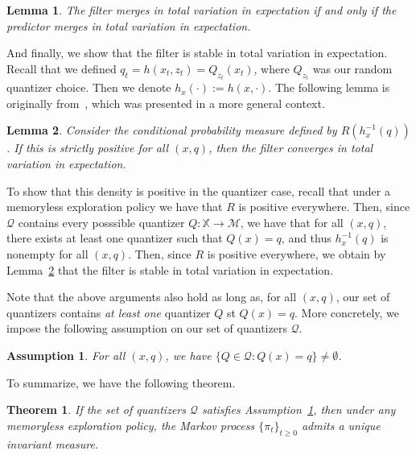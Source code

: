 \documentclass[conference, draftcls, onecolumn]{IEEEtran}
\newtheorem{theorem}{Theorem}
\newtheorem{lemma}{Lemma}
\newtheorem{assumption}{Assumption}
\begin{document}
\begin{lemma}\label{lemma:filter-predictor}\cite[Theorem 2.11]{Curtis}
    The filter merges in total variation in expectation if and only if the predictor merges in total variation in expectation.
\end{lemma}

And finally, we show that the filter is stable in total variation in expectation. Recall that we defined \(q_t = h(x_t,z_t) = Q_{z_t}(x_t)\), where \(Q_{z_t}\) was our random quantizer choice. Then we denote \(h_x(\cdot) := h(x,\cdot)\). The following lemma is originally from~\cite{Handel}, which was presented in a more general context.

\begin{lemma}\label{lemma:nondegenerate}\cite[Corollary 5.5]{Handel}
    Consider the conditional probability measure defined by \( R(h_x^{-1}(q)) \). If this is strictly positive for all \((x,q)\), then the filter converges in total variation in expectation.
\end{lemma}

To show that this density is positive in the quantizer case, recall that under a memoryless exploration policy we have that \(R\) is positive everywhere. Then, since \( \mathcal{Q} \) contains every posssible quantizer \( Q : \mathbb{X} \to \mathcal{M} \), we have that for all \( (x,q) \), there exists at least one quantizer such that \( Q(x) = q \), and thus \( h_x^{-1}(q) \) is nonempty for all \( (x,q) \). Then, since \(R\) is positive everywhere, we obtain by Lemma~\ref{lemma:nondegenerate} that the filter is stable in total variation in expectation.

Note that the above arguments also hold as long as, for all \( (x,q) \), our set of quantizers contains \emph{at least one} quantizer \( Q \) st \( Q(x) = q \). More concretely, we impose the following assumption on our set of quantizers \( \mathcal{Q} \).

\begin{assumption}\label{assumption:one-bin}
    For all \((x,q)\), we have \(\{Q \in \mathcal{Q} : Q(x) = q\} \neq \emptyset\).

\end{assumption}

\noindent To summarize, we have the following theorem.

\begin{theorem}\label{theorem:invariant}
    If the set of quantizers \( \mathcal{Q} \) satisfies Assumption~\ref{assumption:one-bin}, then under any memoryless exploration policy, the Markov process \( \{\pi_t\}_{t\ge0} \) admits a unique invariant measure.
\end{theorem}
\end{document}
